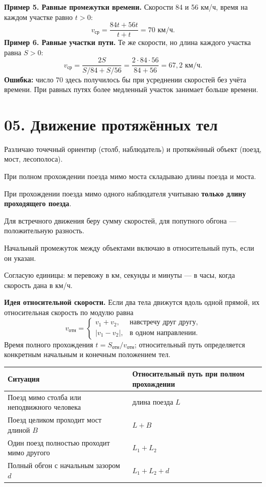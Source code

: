 \documentclass[a4paper,12pt]{article}
\newcommand{\key}[1]{\textcolor{darkaccent}{\bfseries #1}}
\newcommand{\ruleline}{\par\vspace{.15em}{\color{accent!65}\hrule height .6pt}\vspace{.65em}}
\newcommand{\checks}[1]{\item[$\square$] #1}
\begin{document}
\key{Пример 5. Равные промежутки времени.} Скорости 84 и 56 км/ч, время на каждом участке равно $t>0$:
\[
 v_{\text{ср}}=\frac{84t+56t}{t+t}=\boxed{70\text{ км/ч}}.
\]
\key{Пример 6. Равные участки пути.} Те же скорости, но длина каждого участка равна $S>0$:
\[
 v_{\text{ср}}=\frac{2S}{S/84+S/56}
 =\frac{2\cdot84\cdot56}{84+56}=\boxed{67{,}2\text{ км/ч}}.
\]
\key{Ошибка:} число $70$ здесь получилось бы при усреднении скоростей без учёта времени. При равных путях более медленный участок занимает больше времени.

\clearpage
\section*{05. Движение протяжённых тел}
\ruleline
\begin{checklist}
\checks{Различаю точечный ориентир (столб, наблюдатель) и протяжённый объект (поезд, мост, лесополоса).}
\checks{При полном прохождении поезда мимо моста складываю длины поезда и моста.}
\checks{При прохождении поезда мимо одного наблюдателя учитываю \textbf{только длину проходящего поезда}.}
\checks{Для встречного движения беру сумму скоростей, для попутного обгона --- положительную разность.}
\checks{Начальный промежуток между объектами включаю в относительный путь, если он указан.}
\checks{Согласую единицы: м перевожу в км, секунды и минуты --- в часы, когда скорость дана в км/ч.}
\end{checklist}

\key{Идея относительной скорости.} Если два тела движутся вдоль одной прямой, их относительная скорость по модулю равна
\[
 v_{\text{отн}}=\begin{cases}
 v_1+v_2,&\text{навстречу друг другу},\\
 |v_1-v_2|,&\text{в одном направлении}.
 \end{cases}
\]
Время полного прохождения $t=S_{\text{отн}}/v_{\text{отн}}$; относительный путь определяется конкретным начальным и конечным положением тел.

\begin{center}
\renewcommand{\arraystretch}{1.32}
\begin{tabularx}{\linewidth}{>{\raggedright\arraybackslash}X>{\raggedright\arraybackslash}X}
\toprule
Ситуация & Относительный путь при полном прохождении\\
\midrule
Поезд мимо столба или неподвижного человека & длина поезда $L$\\
Поезд целиком проходит мост длиной $B$ & $L+B$\\
Один поезд полностью проходит мимо другого & $L_1+L_2$\\
Полный обгон с начальным зазором $d$ & $L_1+L_2+d$\\
\bottomrule
\end{tabularx}
\end{center}
\end{document}
